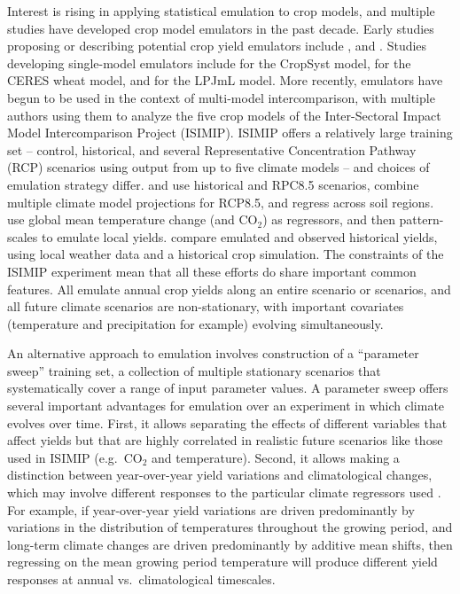 \documentclass[gmd, manuscript]{copernicus} %
\begin{document}
Interest is rising in applying statistical emulation to crop models, and multiple studies have developed crop model emulators in the past decade.
Early studies proposing or describing potential crop yield emulators include \citet{Howden2005, raisen2006, Lobell2010}, and \citet{Ferrise2011}.
Studies developing single-model emulators include  \citet{Holzkamper2012} for the CropSyst model, \citet{RUANE2013a} for the CERES wheat model, and \citet{Oyebamiji15} for the LPJmL model. 
More recently, emulators have begun to be used in the context of multi-model intercomparison, with multiple authors \citep{BLANC2015, BLANC2017, Ostberg2018, Mistry2017}  using them to analyze the five crop models  of the Inter-Sectoral Impact Model Intercomparison Project (ISIMIP). ISIMIP offers a relatively large training set --  control, historical, and several Representative Concentration Pathway (RCP) scenarios using output from up to five climate models \citep{Warszawski3228, Frieler2017} -- and choices of emulation strategy differ.
\citet{BLANC2015} and \citet{BLANC2017} use historical and RPC8.5 scenarios, combine multiple climate model projections for RCP8.5, and regress across soil regions. 
\citet{Ostberg2018} use global mean temperature change (and CO$_2$) as regressors, and then pattern-scales to emulate local yields. 
\citet{Mistry2017} compare emulated and observed historical yields, using local weather data and a historical crop simulation. 
The constraints of the ISIMIP experiment mean that all these efforts do share important common features. 
All emulate annual crop yields along an entire scenario or scenarios, and all future climate scenarios are non-stationary, with important covariates (temperature and precipitation for example) evolving simultaneously. 

An alternative approach to emulation involves construction of a ``parameter sweep'' training set, a collection of multiple stationary scenarios that systematically cover a range of input parameter values.
A parameter sweep offers several important advantages for emulation over an experiment in which climate evolves over time. 
First, it allows separating the effects of different variables that affect yields but that are highly correlated in realistic future scenarios 
like those used in ISIMIP 
(e.g.\ CO$_2$ and temperature). 
Second, it allows making a distinction between year-over-year yield variations and climatological changes, which may involve different responses to the particular climate regressors used \citep[e.g.][]{Ruane2016}. 
For example, if year-over-year yield variations are driven predominantly by variations in the distribution of temperatures throughout the growing period, and long-term climate changes are driven predominantly by additive mean shifts, then regressing on the mean growing period temperature will produce different yield responses at annual vs.\ climatological timescales.  
\end{document}
